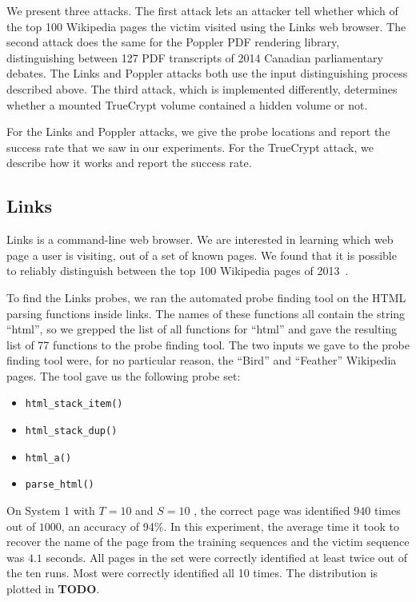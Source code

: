 \documentclass[letterpaper,twocolumn,10pt]{article}
\begin{document}
We present three attacks. The first attack lets an attacker tell whether which
of the top 100 Wikipedia pages the victim visited using the Links web browser.
The second attack does the same for the Poppler PDF rendering library,
distinguishing between 127 PDF transcripts of 2014 Canadian parliamentary
debates. The Links and Poppler attacks both use the input distinguishing process
described above. The third attack, which is implemented differently, determines
whether a mounted TrueCrypt volume contained a hidden volume or not.

For the Links and Poppler attacks, we give the probe locations and report the
success rate that we saw in our experiments. For the TrueCrypt attack, we
describe how it works and report the success rate.

\subsection{Links}

Links is a command-line web browser. We are interested in learning which web
page a user is visiting, out of a set of known pages. We found that it is
possible to reliably distinguish between the top 100 Wikipedia pages of
2013~\cite{wikitop2013}.

To find the Links probes, we ran the automated probe finding tool on the HTML
parsing functions inside links. The names of these functions all contain the
string ``html'', so we grepped the list of all functions for ``html'' and gave
the resulting list of 77 functions to the probe finding tool. The two inputs we
gave to the probe finding tool were, for no particular reason, the ``Bird'' and
``Feather'' Wikipedia pages. The tool gave us the following probe set:

\begin{itemize}
    \item \texttt{html\_stack\_item()}
    \item \texttt{html\_stack\_dup()}
    \item \texttt{html\_a()}
    \item \texttt{parse\_html()}
\end{itemize}

On System 1 with $T=10$ and $S=10$ , the correct page was
identified $940$ times out of $1000$, an accuracy of 94\%. In this experiment,
the average time it took to recover the name of the page from the training
sequences and the victim sequence was $4.1$ seconds. All pages in the set were
correctly identified at least twice out of the ten runs. Most were correctly
identified all 10 times. The distribution is plotted in \textbf{TODO}.
\end{document}
